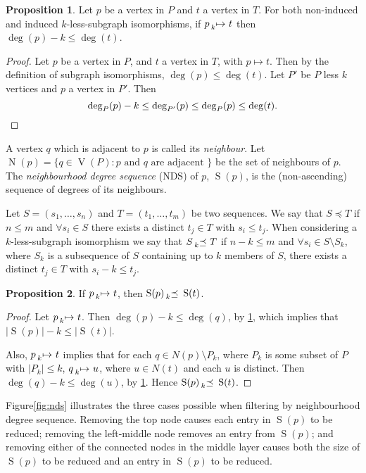 \documentclass[letterpaper]{article}
\theoremstyle{definition}
\newtheorem{proposition}{Proposition}
\newcommand{\lessmap}[1]{\prescript{}{#1}{\mapsto}\ }
\newcommand{\lesspreceq}[1]{\prescript{}{#1}{\preceq}\ }
\newcommand{\V}{\operatorname{V}}
\newcommand{\N}{\operatorname{N}}
\newcommand{\nds}{\operatorname{S}}
\begin{document}
\begin{proposition}
    \label{prop:deg}
    Let $p$ be a vertex in $P$ and $t$ a vertex in $T$. For both non-induced and induced
    $k$-less-subgraph isomorphisms, if $p \lessmap{k} t$ then
    $\deg(p) - k \le \deg(t)$.
\end{proposition}
\begin{proof}
Let $p$ be a vertex in $P$, and $t$ a vertex in $T$, with $p\mapsto t$. Then by the definition of subgraph isomorphisms, $\deg(p) \le \deg(t)$. Let $P'$ be $P$ less $k$ vertices and $p$ a vertex in $P'$. Then
\[
\deg_{P}(p)-k \le \deg_{P'}(p) \le \deg_{P}(p) \le \deg(t). \qedhere
\]
\end{proof}

A vertex $q$ which is adjacent to $p$ is called its \emph{neighbour}.  Let $\N(p) = \{ q \in \V(P) :
 p \text{ and } q \text{ are adjacent }\}$ be the set of neighbours of $p$.  The \emph{neighbourhood
degree sequence} (NDS) of $p$, $\nds(p)$, is the (non-ascending) sequence of degrees of its
neighbours.

Let $S = ( s_1 , \ldots , s_n )$ and $T = ( t_1 , \ldots , t_m)$ be two sequences.  We say that $S
\preceq T$ if $n \leq m$ and $\forall s_i \in S$ there exists a distinct $t_j \in T$ with $s_i \leq
t_j$.  When considering a $k$-less-subgraph isomorphism we say that $S \lesspreceq{k}
T$ if $n - k \leq m$ and $\forall s_i \in S \setminus S_k$, where $S_k$ is a subsequence of $S$
containing up to $k$ members of $S$, there exists a distinct $t_j \in T$ with $s_i - k \leq t_j$.


\begin{proposition}\label{prop:nds}
If $p \lessmap{k} t$, then $\nds(p) \lesspreceq{k} \nds(t)$.
\end{proposition}

\begin{proof}
Let $p \lessmap{k} t$.  Then $\deg(p) - k \leq \deg(q)$, by \cref{prop:deg}, which
implies that $\left|\nds(p)\right| -k \leq \left| \nds(t) \right| $.
 
Also, $p \lessmap{k} t$ implies that for each $q \in N(p) \setminus P_k$, where $P_k$
is some subset of $P$ with $\left| P_k \right| \leq k$, $q \lessmap{k} u$, where $u \in N(t)$ and
each $u$ is distinct.  Then $\deg(q) - k \leq \deg(u)$, by \cref{prop:deg}.  Hence $\nds(p)
\lesspreceq{k} \nds(t)$.
\end{proof}

Figure\ref{fig:nds} illustrates the three cases possible when filtering by neighbourhood degree
sequence.  Removing the top node causes each entry in $\nds(p)$ to be reduced; removing the
left-middle node removes an entry from $\nds(p)$; and removing either of the connected nodes in the
middle layer causes both the size of $\nds(p)$ to be reduced and an entry in $\nds(p)$ to be reduced.
\end{document}
